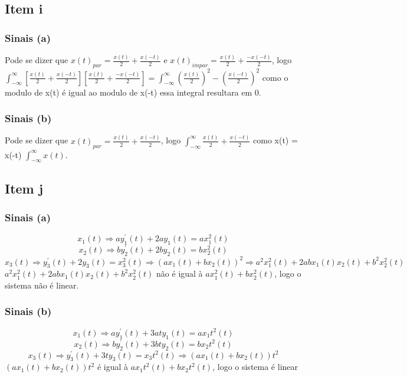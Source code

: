 \documentclass[a4paper, 12pt]{article}
\begin{document}
        \subsection{Item i}
            \subsubsection{Sinais (a)}
            Pode se dizer que $x(t)_{par} = \frac{x(t)}{2} + \frac{x(-t)}{2}$ e $x(t)_{impar} = \frac{x(t)}{2} + \frac{-x(-t)}{2}$, logo $\int_{-\infty}^{\infty} [\frac{x(t)}{2} + \frac{x(-t)}{2}][\frac{x(t)}{2} + \frac{-x(-t)}{2}] = \int_{-\infty}^{\infty} (\frac{x(t)}{2})^{2} - (\frac{x(-t)}{2})^{2} $ como o modulo de x(t) é igual ao modulo de x(-t) essa integral resultara em 0.
            \subsubsection{Sinais (b)}
            Pode se dizer que $x(t)_{par} = \frac{x(t)}{2} + \frac{x(-t)}{2}$, logo $\int_{-\infty}^{\infty} \frac{x(t)}{2} + \frac{x(-t)}{2}$ como x(t) = x(-t) $\int_{-\infty}^{\infty} x(t)$.
        \subsection{Item j}
            \subsubsection{Sinais (a)}
            \[x_{1}(t)  \Rightarrow ay_{1}^{'}(t) + 2ay_{1}(t) = ax_{1}^{2}(t)\]
            \[x_{2}(t)  \Rightarrow by_{2}^{'}(t) + 2by_{2}(t) = bx_{2}^{2}(t)\]
            \[x_{3}(t)  \Rightarrow y_{3}^{'}(t) + 2y_{3}(t) = x_{3}^{2}(t) \Rightarrow (ax_{1}(t) + bx_{2}(t))^{2} \Rightarrow a^{2}x_{1}^{2}(t) + 2abx_{1}(t)x_{2}(t) + b^{2}x_{2}^{2}(t)\]
            $a^{2}x_{1}^{2}(t) + 2abx_{1}(t)x_{2}(t) + b^{2}x_{2}^{2}(t)$ não é igual à  $ax_{1}^{2}(t) + bx_{2}^{2}(t)$, logo o sistema não é linear.
            \subsubsection{Sinais (b)}
            \[x_{1}(t)  \Rightarrow ay_{1}^{'}(t) + 3aty_{1}(t) = ax_{1}t^{2}(t)\]
            \[x_{2}(t)  \Rightarrow by_{2}^{'}(t) + 3bty_{2}(t) = bx_{2}t^{2}(t)\]
			\[x_{3}(t)  \Rightarrow y_{3}^{'}(t) + 3ty_{3}(t) = x_{3}t^{2}(t) \Rightarrow (ax_{1}(t) + bx_{2}(t))t^{2} \]
			$(ax_{1}(t) + bx_{2}(t))t^{2}$ é igual à $ax_{1}t^{2}(t) + bx_{2}t^{2}(t)$, logo o sistema é linear
\end{document}
